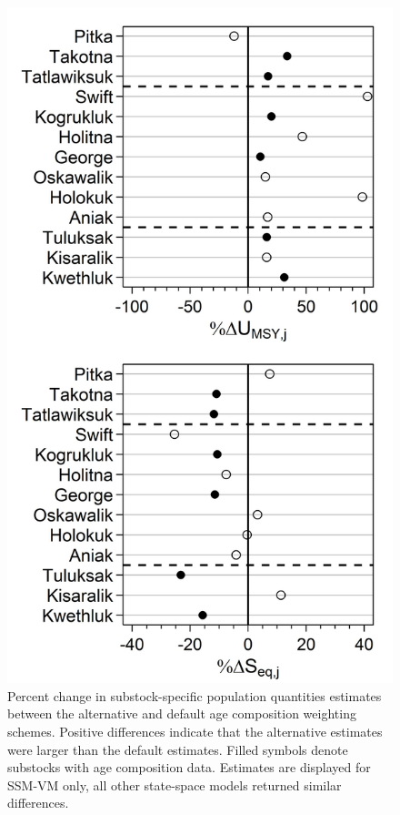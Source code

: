 \documentclass[12pt,]{book}
\theoremstyle{definition}
\theoremstyle{definition}
\theoremstyle{definition}
\theoremstyle{remark}
\begin{document}
\clearpage

\begin{figure}
  \centering
  \includegraphics{img/Ch4/alt-ess-ests.jpg}
  \caption{Percent change in substock-specific population quantities estimates between the alternative and default age composition weighting schemes. Positive differences indicate that the alternative estimates were larger than the default estimates. Filled symbols denote substocks with age composition data. Estimates are displayed for SSM-VM only, all other state-space models returned similar differences.}
  \label{fig:alt-ess-ests}
\end{figure}
\end{document}
